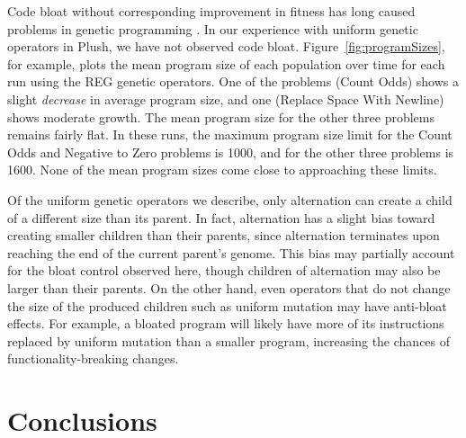 \documentclass[graybox]{svmult}
\begin{document}
Code bloat without corresponding improvement in fitness has long caused problems in genetic programming \cite{Silva:2009:GPEM, luke:dissertation}. In our experience with uniform genetic operators in Plush, we have not observed code bloat.
Figure~\ref{fig:programSizes}, for example, plots the mean program size of each population over time for each run using the REG genetic operators.
One of the problems (Count Odds) shows a slight \emph{decrease} in average program size, and one (Replace Space With Newline) shows moderate growth. The mean program size for the other three problems remains fairly flat. In these runs, the maximum program size limit for the Count Odds and Negative to Zero problems is 1000, and for the other three problems is 1600. None of the mean program sizes come close to approaching these limits.

Of the uniform genetic operators we describe, only alternation can create a child of a different size than its parent. In fact, alternation has a slight bias toward creating smaller children than their parents, since alternation terminates upon reaching the end of the current parent's genome. This bias may partially account for the bloat control observed here, though children of alternation may also be larger than their parents. On the other hand, even operators that do not change the size of the produced children such as uniform mutation may have anti-bloat effects. For example, a bloated program will likely have more of its instructions replaced by uniform mutation than a smaller program, increasing the chances of functionality-breaking changes.




\section{Conclusions}
\end{document}

